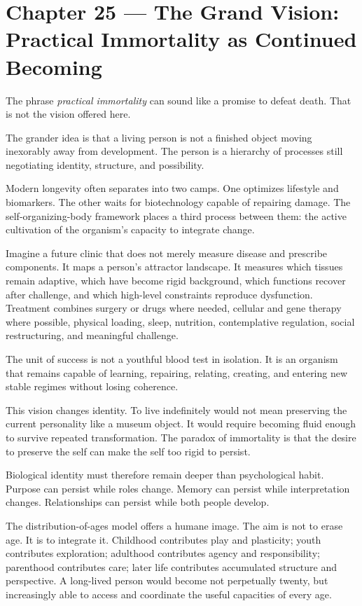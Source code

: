 \chapter{Chapter 25 --- The Grand Vision: Practical Immortality as Continued Becoming}\label{chapter-25-the-grand-vision-practical-immortality-as-continued-becoming}

The phrase \emph{practical immortality} can sound like a promise to defeat death. That is not the vision offered here.

The grander idea is that a living person is not a finished object moving inexorably away from development. The person is a hierarchy of processes still negotiating identity, structure, and possibility.

Modern longevity often separates into two camps. One optimizes lifestyle and biomarkers. The other waits for biotechnology capable of repairing damage. The self-organizing-body framework places a third process between them: the active cultivation of the organism's capacity to integrate change.

Imagine a future clinic that does not merely measure disease and prescribe components. It maps a person's attractor landscape. It measures which tissues remain adaptive, which have become rigid background, which functions recover after challenge, and which high-level constraints reproduce dysfunction. Treatment combines surgery or drugs where needed, cellular and gene therapy where possible, physical loading, sleep, nutrition, contemplative regulation, social restructuring, and meaningful challenge.

The unit of success is not a youthful blood test in isolation. It is an organism that remains capable of learning, repairing, relating, creating, and entering new stable regimes without losing coherence.

This vision changes identity. To live indefinitely would not mean preserving the current personality like a museum object. It would require becoming fluid enough to survive repeated transformation. The paradox of immortality is that the desire to preserve the self can make the self too rigid to persist.

Biological identity must therefore remain deeper than psychological habit. Purpose can persist while roles change. Memory can persist while interpretation changes. Relationships can persist while both people develop.

The distribution-of-ages model offers a humane image. The aim is not to erase age. It is to integrate it. Childhood contributes play and plasticity; youth contributes exploration; adulthood contributes agency and responsibility; parenthood contributes care; later life contributes accumulated structure and perspective. A long-lived person would become not perpetually twenty, but increasingly able to access and coordinate the useful capacities of every age.

